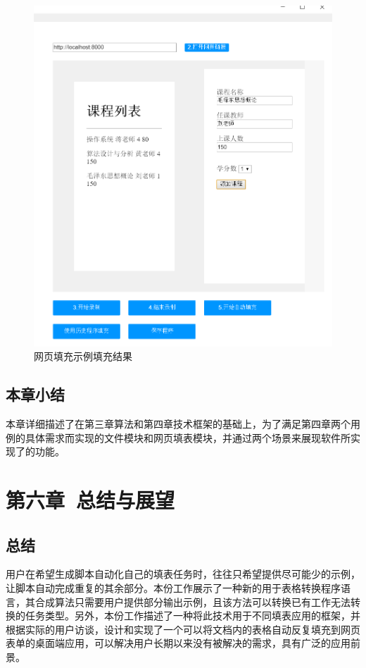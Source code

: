 \documentclass[design, pageheader]{njubachelor}
\begin{document}
\begin{figure}
    \centering
    \includegraphics[width=15cm,keepaspectratio]{figures/ui_2_finish.png}
    \caption{网页填充示例填充结果}
    \label{fig:ui_2_finish}
\end{figure}

\subsection{本章小结}

本章详细描述了在第三章算法和第四章技术框架的基础上，为了满足第四章两个用例的具体需求而实现的文件模块和网页填表模块，并通过两个场景来展现软件所实现了的功能。

\section{第六章~总结与展望}

\subsection{总结}
用户在希望生成脚本自动化自己的填表任务时，往往只希望提供尽可能少的示例，让脚本自动完成重复的其余部分。本份工作展示了一种新的用于表格转换程序语言，其合成算法只需要用户提供部分输出示例，且该方法可以转换已有工作无法转换的任务类型。另外，本份工作描述了一种将此技术用于不同填表应用的框架，并根据实际的用户访谈，设计和实现了一个可以将文档内的表格自动反复填充到网页表单的桌面端应用，可以解决用户长期以来没有被解决的需求，具有广泛的应用前景。
\end{document}
